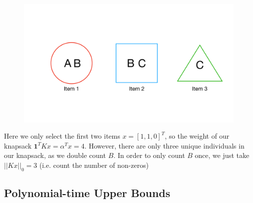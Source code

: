 \documentclass[12pt]{article}
\begin{document}
\begin{figure}[H]
    \centering
    \includegraphics[width = 14cm]{../images/knap_intuition.pdf}
    \label{fig:items}
\end{figure}
Here we only select the first two items $x = [1,1,0]^T$, so the weight of our knapsack $\mathbf{1}^TKx = \alpha^Tx = 4$. However, there are only three unique individuals in our knapsack, as we double count $B$. In order to only count $B$ once, we just take $||Kx||_0 = 3$ (i.e. count the number of non-zeros)

\subsection{Polynomial-time Upper Bounds}
\end{document}
